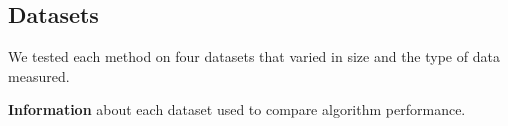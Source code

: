 \documentclass[11pt]{article}
\begin{document}


\subsection{Datasets}

We tested each method on four datasets that varied in size and the type of data measured.

\begin{table}
	\centering
	\caption[Dataset information]{
		\textbf{Information} about each dataset used to compare algorithm performance.
	}
	
	\label{tab:datasets}
\end{table}

\end{document}
